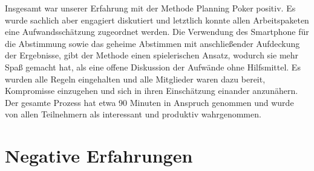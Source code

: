 Insgesamt war unserer Erfahrung mit der Methode Planning Poker positiv. Es wurde sachlich aber engagiert diskutiert und letztlich konnte allen Arbeitspaketen eine Aufwandsschätzung zugeordnet werden. Die Verwendung des Smartphone für die Abstimmung sowie das geheime Abstimmen mit anschließender Aufdeckung der Ergebnisse, gibt der Methode einen spielerischen Ansatz, wodurch sie mehr Spaß gemacht hat, als eine offene Diskussion der Aufwände ohne Hilfsmittel. Es wurden alle Regeln eingehalten und alle Mitglieder waren dazu bereit, Kompromisse einzugehen und sich in ihren Einschätzung einander anzunähern. Der gesamte Prozess hat etwa 90 Minuten in Anspruch genommen und wurde von allen Teilnehmern als interessant und produktiv wahrgenommen.

\section{Negative Erfahrungen}

